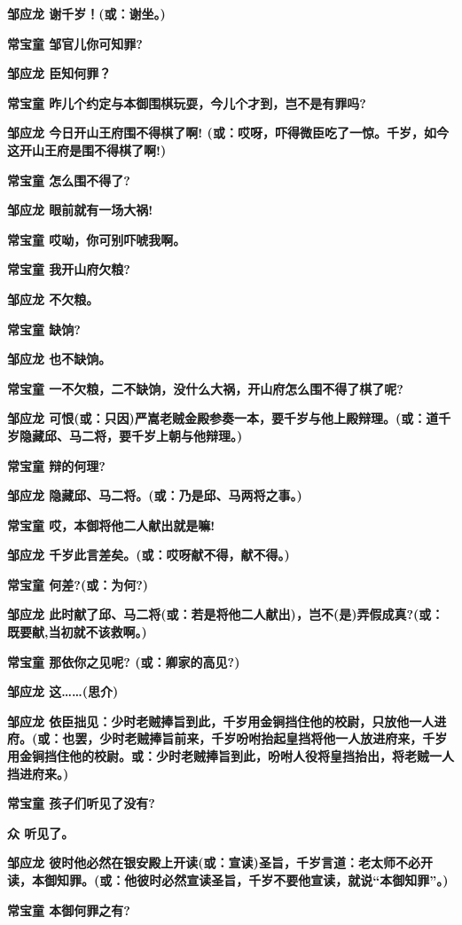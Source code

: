 \textbf{邹应龙 谢千岁！(或：谢坐。)}

\textbf{常宝童 邹官儿你可知罪?}

\textbf{邹应龙 臣知何罪？}

\textbf{常宝童 昨儿个约定与本御围棋玩耍，今儿个才到，岂不是有罪吗?}

\textbf{邹应龙 今日开山王府围不得棋了啊!
(或：哎呀，吓得微臣吃了一惊。千岁，如今这开山王府是围不得棋了啊!)}

\textbf{常宝童 怎么围不得了?}

\textbf{邹应龙 眼前就有一场大祸!}

\textbf{常宝童 哎呦，你可别吓唬我啊。}

\textbf{常宝童 我开山府欠粮?}

\textbf{邹应龙 不欠粮。}

\textbf{常宝童 缺饷?}

\textbf{邹应龙 也不缺饷。}

\textbf{常宝童
一不欠粮，二不缺饷，没什么大祸，开山府怎么围不得了棋了呢?}

\textbf{邹应龙
可恨(或：只因)严嵩老贼金殿参奏一本，要千岁与他上殿辩理。(或：道千岁隐藏邱、马二将，要千岁上朝与他辩理。)}

\textbf{常宝童 辩的何理?}

\textbf{邹应龙 隐藏邱、马二将。(或：乃是邱、马两将之事。)}

\textbf{常宝童 哎，本御将他二人献出就是嘛!}

\textbf{邹应龙 千岁此言差矣。(或：哎呀献不得，献不得。)}

\textbf{常宝童 何差?(或：为何?)}

\textbf{邹应龙
此时献了邱、马二将(或：若是将他二人献出)，岂不(是)弄假成真?(或：既要献,当初就不该救啊。)}

\textbf{常宝童 那依你之见呢? (或：卿家的高见?)}

\textbf{邹应龙 这\ldots{}\ldots{}(思介)}

\textbf{邹应龙
依臣拙见：少时老贼捧旨到此，千岁用金锏挡住他的校尉，只放他一人进府。(或：也罢，少时老贼捧旨前来，千岁吩咐抬起皇挡将他一人放进府来，千岁用金锏挡住他的校尉。或：少时老贼捧旨到此，吩咐人役将皇挡抬出，将老贼一人挡进府来。)}

\textbf{常宝童 孩子们听见了没有?}

\textbf{众 听见了。}

\textbf{邹应龙
彼时他必然在银安殿上开读(或：宣读)圣旨，千岁言道：老太师不必开读，本御知罪。(或：他彼时必然宣读圣旨，千岁不要他宣读，就说``本御知罪''。)}

\textbf{常宝童 本御何罪之有?}

